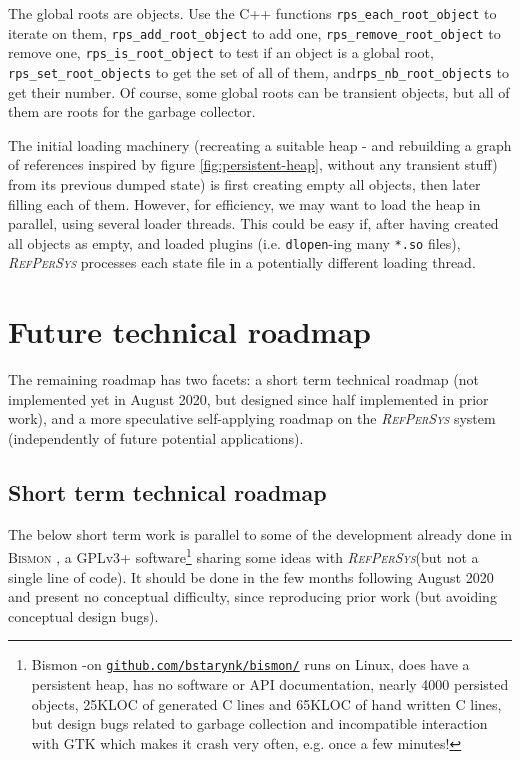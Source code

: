 \documentclass{IEEEtran}
\newcommand{\RefPerSys}{{\textit{\textsc{RefPerSys}}}}
\begin{document}
The global roots are objects. Use the C++ functions
\texttt{rps\_each\_root\_object} to iterate on them,
\texttt{rps\_add\_root\_object} to add one,
\texttt{rps\_remove\_root\_object} to remove one,
\texttt{rps\_is\_root\_object} to test if an object is a global root,
\texttt{rps\_set\_root\_objects} to get the set of all of them,
and\texttt{rps\_nb\_root\_objects} to get their number. Of course,
some global roots can be transient objects, but all of them are roots
for the garbage collector.

The initial loading machinery (recreating a suitable heap - and
rebuilding a graph of references inspired by figure
\ref{fig:persistent-heap}, without any transient stuff) from its
previous dumped state) is first creating empty all objects, then later
filling each of them. However, for efficiency, we may want to load the
heap in parallel, using several loader threads. This could be easy if,
after having created all objects as empty, and loaded plugins
(i.e. \texttt{dlopen}-ing many \texttt{*.so} files), {\RefPerSys}
processes each state file in a potentially different loading thread.

\section{Future technical roadmap}
\label{sec:future-roadmap}

The remaining roadmap has two facets: a short term technical roadmap
(not implemented yet in August 2020, but designed since half
implemented in prior work), and a more speculative self-applying
roadmap on the {\RefPerSys} system (independently of future potential
applications).

\subsection{Short term technical roadmap}
\label{shbsec:short-roadmap}

The below short term work is parallel to some of the development
already done in \textsc{Bismon}
\cite{Starynkevitch:2019:bismon-draft}, a GPLv3+
software\footnote{Bismon -on
\href{https://github.com/bstarynk/bismon}{\texttt{github.com/bstarynk/bismon/}}
runs on Linux, does have a persistent heap, has no software or API
documentation, nearly 4000 persisted objects, 25KLOC of generated C
lines and 65KLOC of hand written C lines, but design bugs related to
garbage collection and incompatible interaction with GTK which makes
it crash very often, e.g. once a few minutes!}  sharing some ideas
with \RefPerSys (but not a single line of code). It should be done in
the few months following August 2020 and present no conceptual
difficulty, since reproducing prior work (but avoiding conceptual
design bugs).
\end{document}
